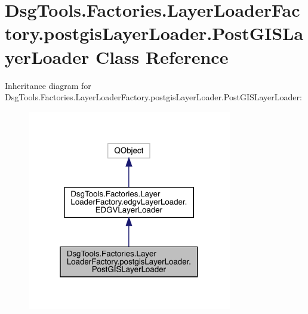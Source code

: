 \hypertarget{class_dsg_tools_1_1_factories_1_1_layer_loader_factory_1_1postgis_layer_loader_1_1_post_g_i_s_layer_loader}{}\section{Dsg\+Tools.\+Factories.\+Layer\+Loader\+Factory.\+postgis\+Layer\+Loader.\+Post\+G\+I\+S\+Layer\+Loader Class Reference}
\label{class_dsg_tools_1_1_factories_1_1_layer_loader_factory_1_1postgis_layer_loader_1_1_post_g_i_s_layer_loader}


Inheritance diagram for Dsg\+Tools.\+Factories.\+Layer\+Loader\+Factory.\+postgis\+Layer\+Loader.\+Post\+G\+I\+S\+Layer\+Loader\+:
\nopagebreak
\begin{figure}[H]
\begin{center}
\leavevmode
\includegraphics[width=253pt]{class_dsg_tools_1_1_factories_1_1_layer_loader_factory_1_1postgis_layer_loader_1_1_post_g_i_s_layer_loader__inherit__graph}
\end{center}
\end{figure}



